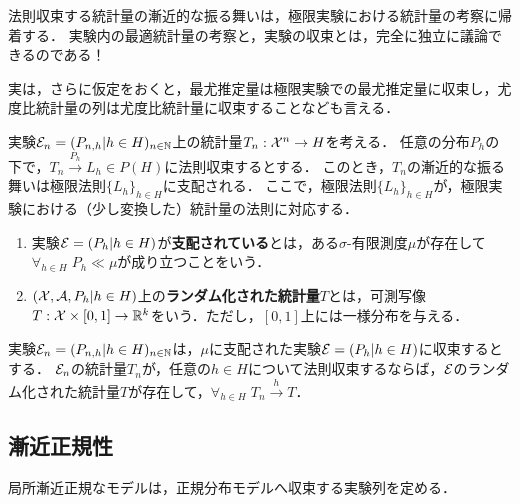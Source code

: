 \documentclass[uplatex,dvipdfmx]{jsreport}
\begin{document}
\begin{tcolorbox}[colframe=ForestGreen, colback=ForestGreen!10!white,breakable,colbacktitle=ForestGreen!40!white,coltitle=black,fonttitle=\bfseries\sffamily,
title=]
    法則収束する統計量の漸近的な振る舞いは，極限実験における統計量の考察に帰着する．
    実験内の最適統計量の考察と，実験の収束とは，完全に独立に議論できるのである！

    実は，さらに仮定をおくと，最尤推定量は極限実験での最尤推定量に収束し，尤度比統計量の列は尤度比統計量に収束することなども言える．
\end{tcolorbox}

\begin{notation}
    実験$\mathcal{E}_n=(P_{n,h}|h\in H)_{n\in\mathbb{N}}$上の統計量$T_n:\mathcal{X}^n\to H$を考える．
    任意の分布$P_h$の下で，$T_n\xrightarrow{P_h} L_h\in P(H)$に法則収束するとする．
    このとき，$T_n$の漸近的な振る舞いは極限法則$\{L_h\}_{h\in H}$に支配される．
    ここで，極限法則$\{L_h\}_{h\in H}$が，極限実験における（少し変換した）統計量の法則に対応する．
\end{notation}

\begin{definition}\mbox{}
    \begin{enumerate}
        \item 実験$\mathcal{E}=(P_h|h\in H)$が\textbf{支配されている}とは，ある$\sigma$-有限測度$\mu$が存在して$\forall_{h\in H}\;P_h\ll\mu$が成り立つことをいう．
        \item $(\mathcal{X},\mathcal{A},P_h|h\in H)$上の\textbf{ランダム化された統計量}$T$とは，可測写像$T:\mathcal{X}\times[0,1]\to\mathbb{R}^k$をいう．ただし，$[0,1]$上には一様分布を与える．
    \end{enumerate}
\end{definition}

\begin{theorem}[法則収束統計量の漸近表現定理]
    実験$\mathcal{E}_n=(P_{n,h}|h\in H)_{n\in\mathbb{N}}$は，$\mu$に支配された実験$\mathcal{E}=(P_h|h\in H)$に収束するとする．
    $\mathcal{E}_n$の統計量$T_n$が，任意の$h\in H$について法則収束するならば，$\mathcal{E}$のランダム化された統計量$T$が存在して，$\forall_{h\in H}\;T_n\xrightarrow{h}T$．
\end{theorem}

\subsection{漸近正規性}

\begin{tcolorbox}[colframe=ForestGreen, colback=ForestGreen!10!white,breakable,colbacktitle=ForestGreen!40!white,coltitle=black,fonttitle=\bfseries\sffamily,
title=]
    局所漸近正規なモデルは，正規分布モデルへ収束する実験列を定める．
\end{tcolorbox}
\end{document}
